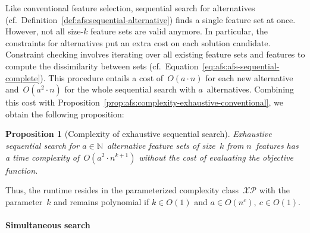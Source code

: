 \documentclass{article}
\newtheorem{proposition}{Proposition}
\theoremstyle{definition}
\begin{document}
Like conventional feature selection, sequential search for alternatives (cf.~Definition~\ref{def:afs:sequential-alternative}) finds a single feature set at once.
However, not all size-$k$ feature sets are valid anymore.
In particular, the constraints for alternatives put an extra cost on each solution candidate.
Constraint checking involves iterating over all existing feature sets and features to compute the dissimilarity between sets (cf.~Equation~\ref{eq:afs:afs-sequential-complete}).
This procedure entails a cost of~$O(a \cdot n)$ for each new alternative and~$O(a^2 \cdot n)$ for the whole sequential search with $a$~alternatives.
Combining this cost with Proposition~\ref{prop:afs:complexity-exhaustive-conventional}, we obtain the following proposition:
%
\begin{proposition}[Complexity of exhaustive sequential search]
	Exhaustive sequential search for $a \in \mathbb{N}$~alternative feature sets of size~$k$ from $n$~features has a time complexity of~$O(a^2 \cdot n^{k+1})$ without the cost of evaluating the objective function.
	\label{prop:afs:complexity-exhaustive-sequential}
\end{proposition}
%
Thus, the runtime resides in the parameterized complexity class~$\mathcal{XP}$ with the parameter~$k$ and remains polynomial if $k \in O(1)$ and $a \in O(n^c),~c \in O(1)$.

\paragraph{Simultaneous search}
\end{document}
